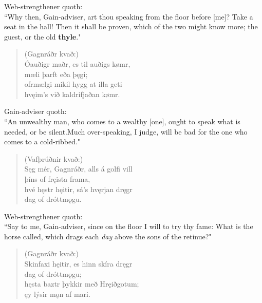 \bvb Web-strengthener quoth: \\ “Why then, Gain-adviser, art thou speaking from the floor before [me]? Take a seat in the hall! Then it shall be proven, which of the two might know more; the guest, or the old \textbf{thyle}." \\

\begin{verse}
(Gagnráðr kvað:) \\%
\bva Óauðigr maðr, \hld es til auðigs kømr, \\%
\ind mæli þarft eða þęgi; \\%
ofrmælgi mikil \hld hygg at illa geti \\%
\ind hvęim's við kaldrifjaðan kømr.\\%
\end{verse}

\bvb Gain-adviser quoth: \\ “An unwealthy man, who comes to a wealthy [one], ought to speak what is needed, or be silent.\footnotemark[14] Much over-speaking\footnotemark[15], I judge, will be bad for the one who comes to a cold-ribbed\footnotemark[16] [man]." \\

\begin{verse}
(Vafþrúðnir kvað:) \\%
\bva Sęg mér, Gagnráðr, \hld alls á golfi vill \\%
\ind þíns of fręista frama, \\%
hvé hęstr hęitir, \hld sá's hvęrjan dręgr \\%
\ind dag of dróttmǫgu.\\%
\end{verse}

\bvb Web-strengthener quoth: \\ “Say to me, Gain-adviser, since on the floor I will to try thy fame: What is the horse called, which drags each \emph{day} above the sons of the retinue\footnotemark[20]?" \\

\begin{verse}
(Gagnráðr kvað:) \\%
\bva Skinfaxi hęitir, \hld es hinn skíra dręgr \\%
\ind dag of dróttmǫgu; \\%
hęsta baztr \hld þykkir með Hręiðgotum; \\%
\ind ęy lýsir mǫn af mari.\\%
\end{verse}

